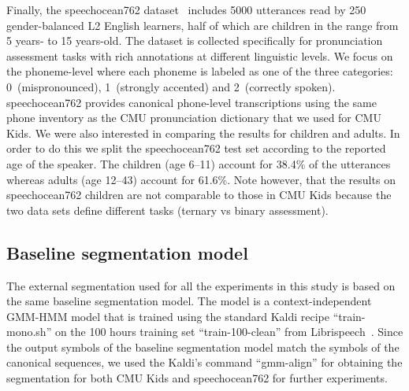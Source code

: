 Finally, the speechocean762 dataset~\cite{speechocean762} includes 5000 utterances read by 250 gender-balanced L2 English learners, half of which are children in the range from 5 years- to 15 years-old.
The dataset is collected specifically for pronunciation assessment tasks with rich annotations at different linguistic levels.
We focus on the phoneme-level where each phoneme is labeled as one of the three categories: 0~(mispronounced),
1~(strongly accented) and 2~(correctly spoken).
speechocean762 provides canonical phone-level transcriptions using the same phone inventory as the CMU pronunciation dictionary that we used for CMU Kids.
We were also interested in comparing the results for children and adults.
In order to do this we split the speechocean762 test set according to the reported age of the speaker.
The children (age 6--11) account for 38.4\% of the utterances whereas adults (age 12--43) account for 61.6\%.
Note however, that the results on speechocean762 children are not comparable to those in CMU Kids because the two data sets define different tasks (ternary vs binary assessment).

\subsection{Baseline segmentation model}
The external segmentation used for all the experiments in this study is based on the same baseline segmentation model. 
The model is a context-independent GMM-HMM model that is trained using the standard Kaldi recipe “train-mono.sh” on the 100 hours training set “train-100-clean” from Librispeech~\cite{libri}.
Since the output symbols of the baseline segmentation model match the symbols of the canonical sequences, we used the Kaldi's command ``gmm-align'' for obtaining the segmentation for both CMU Kids and speechocean762 for further experiments.

